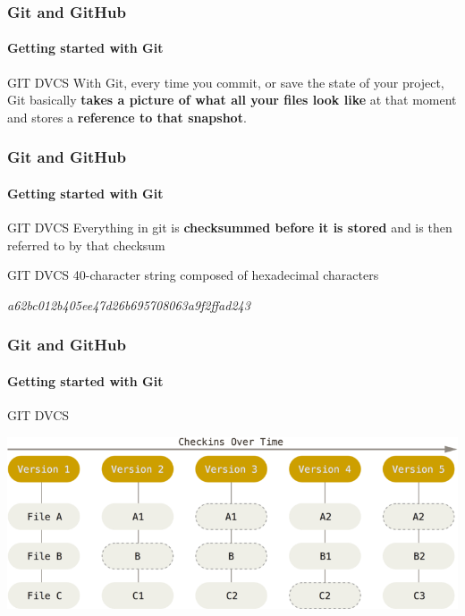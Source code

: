\begin{frame}
    \frametitle{Git and GitHub}
    \framesubtitle{Getting started with Git}
    \addtocounter{nframe}{1}
    
    \begin{block}{GIT DVCS}
        With Git, every time you commit, or save the state of your project, Git basically \textbf{takes a picture of what all your files look like} at that moment and stores a \textbf{reference to that snapshot}.    
    \end{block}

\end{frame}

\begin{frame}
    \frametitle{Git and GitHub}
    \framesubtitle{Getting started with Git}
    \addtocounter{nframe}{1}
    
    \begin{block}{GIT DVCS}
        Everything in git is \textbf{checksummed before it is stored} and is then referred to by that checksum
    \end{block}

    \begin{block}{GIT DVCS}
        40-character string composed of hexadecimal characters
    \end{block}
   
    \textit{a62bc012b405ee47d26b695708063a9f2ffad243}

\end{frame}




\begin{frame}
    \frametitle{Git and GitHub}
    \framesubtitle{Getting started with Git}
    \addtocounter{nframe}{1}
    
    \begin{block}{GIT DVCS}
        \begin{center}

            \includegraphics[width=.7\textwidth]{imgs/snapshots-git.png}
    
        \end{center}
    
    \end{block}
    

\end{frame}

